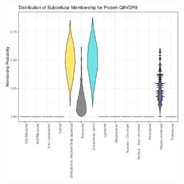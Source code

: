 \documentclass[12pt,english]{article}\usepackage[]{graphicx}\usepackage[]{color}
\makeatletter
\def\maxwidth{ %
  \ifdim\Gin@nat@width>\linewidth
    \linewidth
  \else
    \Gin@nat@width
  \fi
}
\newenvironment{knitrout}{}{} %
\makeatother
\begin{document}
\begin{figure}[p]
  \centering
  \begin{subfigure}[t]{0.5\textwidth}
    \centering
\begin{knitrout}
\color{fgcolor}

{\centering \includegraphics[width=\maxwidth]{figure/Q8VDR9-prob-1} 

}



\end{knitrout}
    \caption{}
  \end{subfigure}%
  \begin{subfigure}[t]{0.5\textwidth}
    \centering
\begin{knitrout}
\color{fgcolor}


\end{knitrout}
\end{subfigure}
\end{figure}
\end{document}

